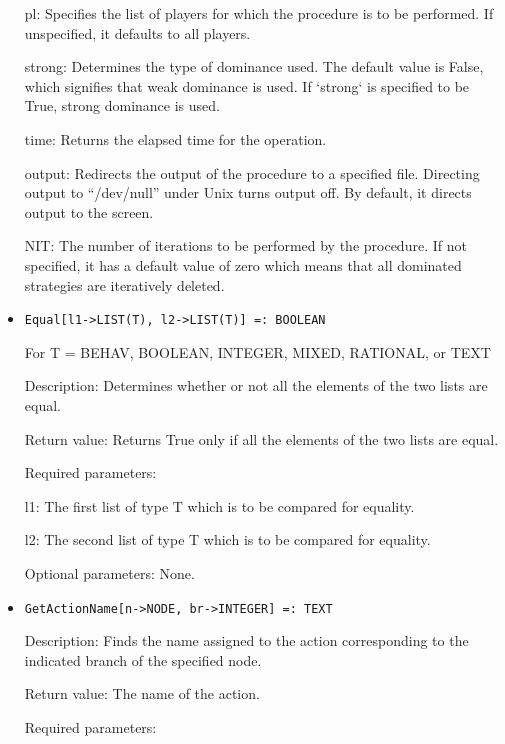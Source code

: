 \begin{itemize}
\bd
\item
[pl:] Specifies the list of players for which the procedure is to be
performed.  If unspecified, it defaults to all players.
\item
[strong:] Determines the type of dominance used.  The default value is
False, which signifies that weak dominance is used.  If `strong` is
specified to be True, strong dominance is used.
\item
[time:] Returns the elapsed time for the operation.
\item
[output:] Redirects the output of the procedure to a specified file.
Directing output to ``/dev/null'' under Unix turns output off.  By
default, it directs output to the screen.
\item
[NIT:] The number of iterations to be performed by the procedure.  If
not specified, it has a default value of zero which means that all
dominated strategies are iteratively deleted.
\ed
\ed

\item
\protect \large \begin{verbatim}
Equal[l1->LIST(T), l2->LIST(T)] =: BOOLEAN
\end{verbatim}\normalsize

	For T = BEHAV, BOOLEAN, INTEGER, MIXED, RATIONAL, or TEXT

\bd
\item
[Description:] Determines whether or not all the elements of the two
lists are equal.
\item
[Return value:] Returns True only if all the elements of the two lists
are equal.
\item
[Required parameters:]\hfil\null
	
\bd
\item
[l1:] The first list of type T which is to be compared for equality.
\item
[l2:] The second list of type T which is to be compared for equality.
\ed

\item
[Optional parameters:] None.

\ed



\item
\protect \large \begin{verbatim}
GetActionName[n->NODE, br->INTEGER] =: TEXT
\end{verbatim}\normalsize

\bd
\item
[Description:] Finds the name assigned to the action corresponding to
the indicated branch of the specified node.
\item   
[Return value:] The name of the action.
\item
[Required parameters:]\hfil\null
	

\end{itemize}
